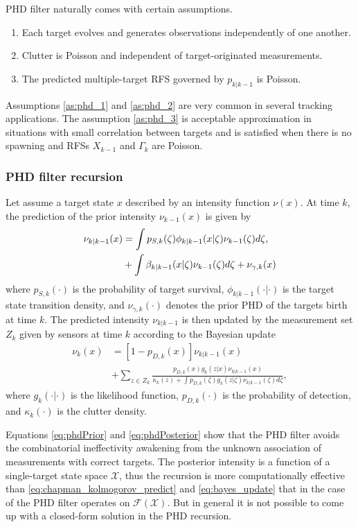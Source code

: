 PHD filter naturally comes with certain assumptions.
\begin{enumerate}
    \item Each target evolves and generates observations independently of one another. \label{as:phd_1}
    \item Clutter is Poisson and independent of target-originated measurements. \label{as:phd_2}
    \item The predicted multiple-target RFS governed by $p_{k|k-1}$ is Poisson. \label{as:phd_3}
\end{enumerate}

Assumptions \ref{as:phd_1} and \ref{as:phd_2} are very common in several tracking applications. The assumption \ref{as:phd_3} is acceptable approximation in situations with small correlation between targets and is satisfied when
there is no spawning and RFSs $X_{k-1}$ and $\Gamma_k$ are Poisson.

            \subsubsection{PHD filter recursion}
Let assume a target state $x$ described by an intensity function $\nu(x)$. At time $k$, the prediction of the prior intensity $\nu_{k-1}(x)$ is given by
\begin{align}
    \nu_{k|k-1}(x) &= \int p_{S,k}(\zeta)\phi_{k|k-1}(x|\zeta)\nu_{k-1}(\zeta)d\zeta , \notag \\
        &+ \int \beta_{k|k-1}(x|\zeta) \nu_{k-1}(\zeta)d\zeta + \nu_{\gamma,k}(x)
    \label{eq:phdPrior}
\end{align}
where $p_{S,k}(\cdot)$ is the probability of target survival, $\phi_{k|k-1}(\cdot|\cdot)$ is the target state transition density, and $\nu_{\gamma,k}(\cdot)$ denotes the prior PHD of the targets birth at time $k$.
The predicted intensity $\nu_{k|k-1}$ is then updated by the measurement set $Z_k$ given by sensors at time $k$ according to the Bayesian update
\begin{align}
        \nu_k(x) &= [1 - p_{D,k}(x)]\nu_{k|k-1}(x) \\
        &+ \sum_{z \in Z_k}\frac{p_{D,k}(x) g_k(z|x) \nu_{k|k-1}(x)}{\kappa_k(z) + \int p_{D,k}(\zeta) g_k(z|\zeta) \nu_{k|k-1}(\zeta)d\zeta}, \label{eq:phdPosterior}
\end{align}
where $g_k(\cdot|\cdot)$ is the likelihood function, $p_{D,k}(\cdot)$ is the probability of detection, and $\kappa_k(\cdot)$ is the clutter density.

Equations \eqref{eq:phdPrior} and \eqref{eq:phdPosterior} show that the PHD filter avoids the combinatorial
ineffectivity awakening from the unknown association of measurements with correct targets. The posterior intensity is
a function of a single-target state space $\mathcal{X}$, thus the recursion is more computationally effective than \eqref{eq:chapman_kolmogorov_predict} and \eqref{eq:bayes_update} that in the case of the PHD filter operates on $\mathcal{F(X)}$. But in general it is not possible to come up with a closed-form solution in the PHD recursion.

